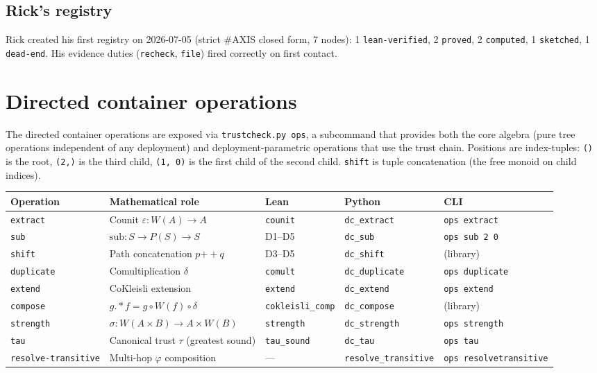 \documentclass[11pt,a4paper]{article}
\newcommand{\level}[1]{\texttt{#1}}
\newcommand{\field}[1]{\texttt{#1}}
\theoremstyle{plain}
\theoremstyle{definition}
\begin{document}
\subsection{Rick's registry}

Rick created his first registry on 2026-07-05 (strict \#AXIS closed
form, 7 nodes): 1 \level{lean-verified}, 2 \level{proved}, 2
\level{computed}, 1 \level{sketched}, 1 \level{dead-end}. His evidence
duties (\field{recheck}, \field{file}) fired correctly on first contact.

\section{Directed container operations}
\label{sec:operations}

The directed container operations are exposed via \texttt{trustcheck.py ops},
a subcommand that provides both the core algebra (pure tree operations
independent of any deployment) and deployment-parametric operations that
use the trust chain. Positions are index-tuples: \texttt{()} is the root,
\texttt{(2,)} is the third child, \texttt{(1, 0)} is the first child of
the second child. \texttt{shift} is tuple concatenation (the free monoid
on child indices).

\begin{center}
\begin{tabular}{lllll}
\toprule
Operation & Mathematical role & Lean & Python & CLI \\
\midrule
\texttt{extract}  & Counit $\varepsilon : W(A) \to A$ & \texttt{counit} & \texttt{dc\_extract} & \texttt{ops extract} \\
\texttt{sub}       & $\mathrm{sub} : S \to P(S) \to S$ & D1--D5 & \texttt{dc\_sub} & \texttt{ops sub 2 0} \\
\texttt{shift}     & Path concatenation $p \mathbin{+\!\!+} q$ & D3--D5 & \texttt{dc\_shift} & (library) \\
\texttt{duplicate} & Comultiplication $\delta$ & \texttt{comult} & \texttt{dc\_duplicate} & \texttt{ops duplicate} \\
\texttt{extend}    & CoKleisli extension & \texttt{extend} & \texttt{dc\_extend} & \texttt{ops extend} \\
\texttt{compose}   & $g \mathbin{.*} f = g \circ W(f) \circ \delta$ & \texttt{cokleisli\_comp} & \texttt{dc\_compose} & (library) \\
\texttt{strength}  & $\sigma : W(A \times B) \to A \times W(B)$ & \texttt{strength} & \texttt{dc\_strength} & \texttt{ops strength} \\
\texttt{tau}       & Canonical trust $\tau$ (greatest sound) & \texttt{tau\_sound} & \texttt{dc\_tau} & \texttt{ops tau} \\
\texttt{resolve-transitive} & Multi-hop $\varphi$ composition & --- & \texttt{resolve\_transitive} & \texttt{ops resolve\text{-}transitive} \\
\bottomrule
\end{tabular}
\end{center}
\end{document}
